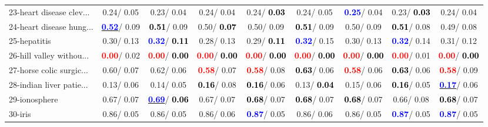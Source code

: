\begin{table}[h]
\begin{center}
\begin{tabular}{lc|c|c|c|c|c|c|c}
23-heart disease clev... &   0.24/  0.05 &   0.23/  0.04 &   0.24/  0.04 &   0.24/\textcolor{black}{\textbf{  0.03}} &   0.24/  0.05 & \textcolor{blue}{\textbf{  0.25}}/  0.04 &   0.23/\textcolor{black}{\textbf{  0.03}} &   0.24/  0.04 \\
24-heart disease hung... & \underline{\textcolor{blue}{\textbf{  0.52}}}/  0.09 & \textcolor{black}{\textbf{  0.51}}/  0.09 &   0.50/\textcolor{black}{\textbf{  0.07}} &   0.50/  0.09 & \textcolor{black}{\textbf{  0.51}}/  0.09 &   0.50/  0.09 & \textcolor{black}{\textbf{  0.51}}/  0.08 &   0.49/  0.08 \\
25-hepatitis &   0.30/  0.13 & \textcolor{blue}{\textbf{  0.32}}/\textcolor{black}{\textbf{  0.11}} &   0.28/  0.13 &   0.29/\textcolor{black}{\textbf{  0.11}} & \textcolor{blue}{\textbf{  0.32}}/  0.15 &   0.30/  0.13 & \textcolor{blue}{\textbf{  0.32}}/  0.14 &   0.31/  0.12 \\
26-hill valley withou... & \textcolor{red}{\textbf{  0.00}}/  0.02 & \textcolor{red}{\textbf{  0.00}}/\textcolor{black}{\textbf{  0.00}} & \textcolor{red}{\textbf{  0.00}}/\textcolor{black}{\textbf{  0.00}} & \textcolor{red}{\textbf{  0.00}}/\textcolor{black}{\textbf{  0.00}} & \textcolor{red}{\textbf{  0.00}}/\textcolor{black}{\textbf{  0.00}} & \textcolor{red}{\textbf{  0.00}}/\textcolor{black}{\textbf{  0.00}} & \textcolor{red}{\textbf{  0.00}}/  0.01 & \textcolor{red}{\textbf{  0.00}}/\textcolor{black}{\textbf{  0.00}} \\
27-horse colic surgic... &   0.60/  0.07 &   0.62/  0.06 & \textcolor{red}{\textbf{  0.58}}/  0.07 & \textcolor{red}{\textbf{  0.58}}/  0.08 & \textcolor{black}{\textbf{  0.63}}/  0.06 & \textcolor{red}{\textbf{  0.58}}/  0.06 & \textcolor{black}{\textbf{  0.63}}/  0.06 & \textcolor{red}{\textbf{  0.58}}/  0.09 \\
28-indian liver patie... &   0.13/  0.06 &   0.14/  0.05 & \textcolor{black}{\textbf{  0.16}}/  0.08 & \textcolor{black}{\textbf{  0.16}}/  0.06 &   0.13/\textcolor{black}{\textbf{  0.04}} &   0.15/  0.06 & \textcolor{black}{\textbf{  0.16}}/  0.05 & \underline{\textcolor{blue}{\textbf{  0.17}}}/  0.06 \\ \hline
29-ionosphere &   0.67/  0.07 & \underline{\textcolor{blue}{\textbf{  0.69}}}/\textcolor{black}{\textbf{  0.06}} &   0.67/  0.07 & \textcolor{black}{\textbf{  0.68}}/  0.07 & \textcolor{black}{\textbf{  0.68}}/  0.07 & \textcolor{black}{\textbf{  0.68}}/  0.07 &   0.66/  0.08 & \textcolor{black}{\textbf{  0.68}}/  0.07 \\
30-iris &   0.86/  0.05 &   0.86/  0.05 &   0.86/  0.06 & \textcolor{blue}{\textbf{  0.87}}/  0.05 &   0.86/  0.06 &   0.86/  0.05 & \textcolor{blue}{\textbf{  0.87}}/  0.05 & \textcolor{blue}{\textbf{  0.87}}/  0.05 \\

\end{tabular}
\end{center}
\end{table}
